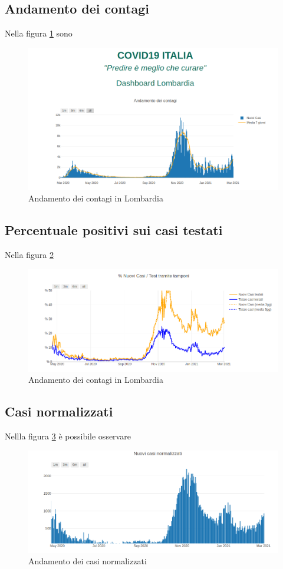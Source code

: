 \subsection{Andamento dei contagi}
Nella figura \ref{fig:andamento_lomb} sono
\begin{figure}[htp]
    \centering
    \includegraphics[width=12cm]{img/lomb/andamento_lomb.png}
    \caption{Andamento dei contagi in Lombardia}
    \label{fig:andamento_lomb}
\end{figure}

\subsection{Percentuale positivi sui casi testati}
Nella figura \ref{fig:positivi_testati_lomb}
\begin{figure}[htp]
    \centering
    \includegraphics[width=12cm]{img/lomb/casi_tamp_lomb.png}
    \caption{Andamento dei contagi in Lombardia}
    \label{fig:positivi_testati_lomb}
\end{figure}

\subsection{Casi normalizzati}
Nellla figura \ref{fig:casi_norm_lomb} è possibile osservare
\begin{figure}[htp]
    \centering
    \includegraphics[width=12cm]{img/lomb/casi_norm_lomb.png}
    \caption{Andamento dei casi normalizzati}
    \label{fig:casi_norm_lomb}
\end{figure}

